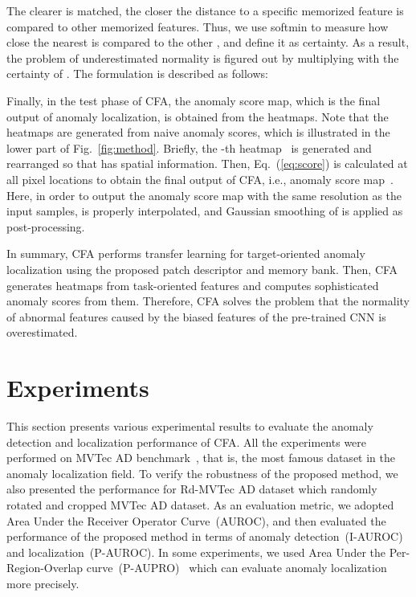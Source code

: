 \documentclass[10pt,twocolumn,letterpaper]{article}
\begin{document}
        The clearer  is matched, the closer the distance to a specific memorized feature is compared to other memorized features. Thus, we use softmin to measure how close the nearest  is compared to the other , and define it as certainty. As a result, the problem of underestimated normality is figured out by multiplying  with the certainty of . The formulation is described as follows:
        
        Finally, in the test phase of CFA, the anomaly score map, which is the final output of anomaly localization, is obtained from the heatmaps. Note that the heatmaps are generated from naive anomaly scores, which is illustrated in the lower part of Fig.~\ref{fig:method}. Briefly, the -th heatmap~ is generated and rearranged so that  has spatial information. Then, Eq.~(\ref{eq:score}) is calculated at all pixel locations to obtain the final output of CFA, i.e., anomaly score map~. Here, in order to output the anomaly score map with the same resolution as the input samples,  is properly interpolated, and Gaussian smoothing of  is applied as post-processing.
        
        In summary, CFA performs transfer learning for target-oriented anomaly localization using the proposed patch descriptor and memory bank. Then, CFA generates heatmaps from task-oriented features and computes sophisticated anomaly scores from them. Therefore, CFA solves the problem that the normality of abnormal features caused by the biased features of the pre-trained CNN is overestimated.
    
\section{Experiments}
    This section presents various experimental results to evaluate the anomaly detection and localization performance of CFA.
    All the experiments were performed on MVTec AD benchmark~\cite{mvtec}, that is, the most famous dataset in the anomaly localization field. 
    To verify the robustness of the proposed method, we also presented the performance for Rd-MVTec AD dataset which randomly rotated and cropped MVTec AD dataset.
    As an evaluation metric, we adopted Area Under the Receiver Operator Curve~(AUROC), and then evaluated the performance of the proposed method in terms of anomaly detection~(I-AUROC) and localization~(P-AUROC). In some experiments, we used Area Under the Per-Region-Overlap curve~(P-AUPRO)~\cite{aupro} which can evaluate anomaly localization more precisely.
\end{document}

